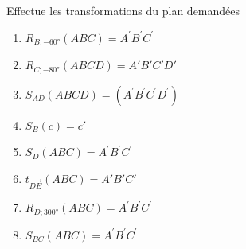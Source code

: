 %
%
  Effectue les transformations du plan demandées
  \begin{enumerate}
    \item $R_{B; \ang{-60}}\left( ABC \right) = A^{'}B^{'}C^{'}$
          \begin{center}
            
          \end{center}
    \item $R_{C; \ang{-80}}\left( ABCD \right) = A'B'C'D'$
          \begin{center}
            
          \end{center}
    \item $S_{AD}(ABCD) = (A^{'}B^{'}C^{'}D^{'})$
          \begin{center}
            
          \end{center}
          \newpage
    \item $S_{B}(c) = c'$
          \begin{center}
            
          \end{center}
    \item $S_{D}\left( ABC \right) = A^{'}B^{'}C^{'}$
          \begin{center}
            
          \end{center}
    \item $t_{\overrightarrow{DE}}\left( ABC \right) = A'B'C'$
          \begin{center}
            
          \end{center}
          \newpage
    \item $R_{D;\ang{300}}\left( ABC \right) = A^{'}B^{'}C^{'}$
          \begin{center}
            
          \end{center}
    \item $S_{BC}\left( ABC \right) = A^{'}B^{'}C^{'}$
          \begin{center}
            

\end{center}
\end{enumerate}
